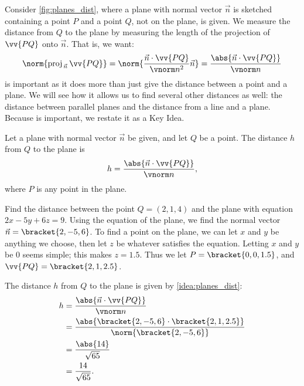 Consider \autoref{fig:planes_dist}, where a plane with normal vector $\vec n$ is sketched containing a point $P$ and a point $Q$, not on the plane, is given. We measure the distance from $Q$ to the plane by measuring the length of the projection of $\vv{PQ}$ onto $\vec n$. That is, we want:
\begin{equation}
\norm{\text{proj}_{\,\vec n}\,{\vv{PQ}}}
= \norm{\frac{\vec n\cdot \vv{PQ}}{\vnorm n^2}\vec n}
= \frac{\abs{\vec n\cdot \vv{PQ}}}{\vnorm n}
\label{eq:plane_dist}
\end{equation}
 is important as it does more than just give the distance between a point and a plane. We will see how it allows us to find several other distances as well: the distance between parallel planes and the distance from a line and a plane. Because  is important, we restate it as a Key Idea.

\begin{keyidea}\label{idea:planes_dist}
Let a plane with normal vector $\vec n$ be given, and let $Q$ be a point. The distance $h$ from $Q$ to the plane is 
\[h = \frac{\abs{\vec n\cdot \vv{PQ}}}{\vnorm n},\]
where $P$ is any point in the plane.
\end{keyidea}

\begin{example}\label{ex_planes6}
Find the distance between the point $Q = (2,1,4)$ and the plane with equation $2x-5y+6z=9$.
\solution
Using the equation of the plane, we find the normal vector $\vec n =\bracket{2,-5,6}$. To find a point on the plane, we can let $x$ and $y$ be anything we choose, then let $z$ be whatever satisfies the equation. Letting $x$ and $y$ be 0 seems simple; this makes $z = 1.5$. Thus we let $P =\bracket{0,0,1.5}$, and $\vv{PQ} =\bracket{2,1,2.5}$.

The distance $h$ from $Q$ to the plane is given by \autoref{idea:planes_dist}:
\begin{align*}
h &= \frac{\abs{\vec n\cdot \vv{PQ}}}{\vnorm n} \\
  &= \frac{\abs{\bracket{2,-5,6}\cdot\bracket{2,1,2.5}}}{\norm{\bracket{2,-5,6}}} \\
	&= \frac{\abs{14}}{\sqrt{65}} \\
	&= \frac{14}{\sqrt{65}} %
	.
\end{align*}
\end{example}

